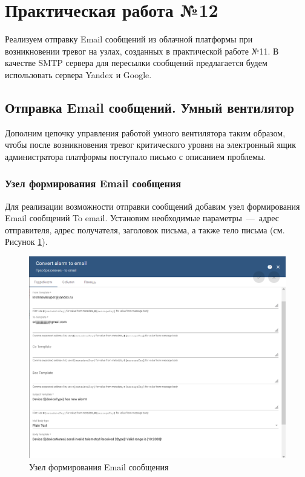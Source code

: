 \documentclass[a4paper,14pt]{extarticle}
\begin{document}
\section{Практическая работа №12}
Реализуем отправку Email сообщений из облачной платформы при возникновении тревог на узлах, созданных в практической работе №11.
В качестве SMTP сервера для пересылки
сообщений предлагается будем использовать сервера Yandex и Google.

\subsection{Отправка Email сообщений. Умный вентилятор}

Дополним цепочку управления работой умного вентилятора таким образом, чтобы после возникновения тревог критического уровня на электронный ящик администратора платформы поступало письмо с описанием проблемы.
\subsubsection*{Узел формирования Email сообщения}
\label{sec:to-email}
Для реализации возможности отправки сообщений добавим узел формирования Email сообщений To email. Установим необходимые параметры~---~адрес отправителя, адрес получателя, заголовок письма, а также тело письма (см. Рисунок \ref{fig:to-email-params}).


 
\begin{figure}[h!]
	\centering
	\includegraphics[width=1\linewidth]{images/to-email-params}
	\caption{Узел формирования Email сообщения}
	\label{fig:to-email-params}
\end{figure}
\end{document}

